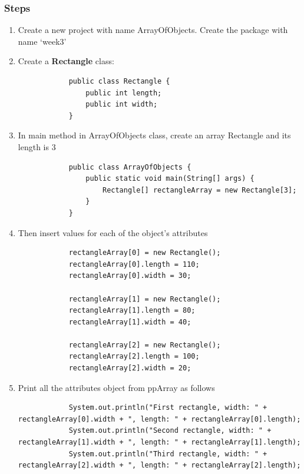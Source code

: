 \documentclass[12pt,titlepage]{article}
\begin{document}
\subsubsection{Steps}
\begin{enumerate}
    \item Create a new project with name ArrayOfObjects. Create the package with name ‘week3’
    \item {
        Create a \textbf{Rectangle} class:

        \begin{verbatim}
            public class Rectangle {
                public int length;
                public int width;
            }
        \end{verbatim}
    }
    \item {
        In main method in ArrayOfObjects class, create an array Rectangle and its length is 3

        \begin{verbatim}
            public class ArrayOfObjects {
                public static void main(String[] args) {
                    Rectangle[] rectangleArray = new Rectangle[3];
                }
            }
        \end{verbatim}
    }
    \item {
        Then insert values for each of the object's attributes

        \begin{verbatim}
            rectangleArray[0] = new Rectangle();
            rectangleArray[0].length = 110;
            rectangleArray[0].width = 30;

            rectangleArray[1] = new Rectangle();
            rectangleArray[1].length = 80;
            rectangleArray[1].width = 40;

            rectangleArray[2] = new Rectangle();
            rectangleArray[2].length = 100;
            rectangleArray[2].width = 20;
        \end{verbatim}
    }
    \item {
        Print all the attributes object from ppArray as follows

        \begin{verbatim}
            System.out.println("First rectangle, width: " + rectangleArray[0].width + ", length: " + rectangleArray[0].length);
            System.out.println("Second rectangle, width: " + rectangleArray[1].width + ", length: " + rectangleArray[1].length);
            System.out.println("Third rectangle, width: " + rectangleArray[2].width + ", length: " + rectangleArray[2].length);
        \end{verbatim}
    }
\end{enumerate}
\end{document}
